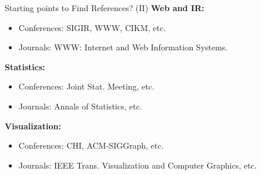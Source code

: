 \begin{frame}{Starting points to Find References? (II)}
	\textbf{Web and IR:}
	\begin{itemize}
		\item Conferences: SIGIR, WWW, CIKM, etc.
		\item Journals: WWW: Internet and Web Information Systems.
	\end{itemize}
	\textbf{Statistics:}
	\begin{itemize}
		\item Conferences: Joint Stat. Meeting, etc.
		\item Journals: Annals of Statistics, etc.
	\end{itemize}
	\textbf{Visualization:}
	\begin{itemize}
		\item Conferences: CHI, ACM-SIGGraph, etc.
		\item Journals: IEEE Trans. Visualization and Computer Graphics, etc.
	\end{itemize}
\end{frame}